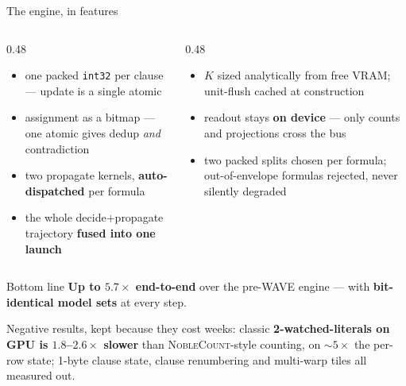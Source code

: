 \documentclass[aspectratio=169,11pt]{beamer}
\newcommand{\good}[1]{\textcolor{gpapgreen}{#1}}
\newcommand{\rem}[1]{{\footnotesize\textcolor{gpapgray}{#1}}}
\newcommand{\NC}{\textsc{NobleCount}}
\newcommand{\keyw}[1]{\textcolor{gpapblue}{\textbf{#1}}}
\begin{document}
\begin{frame}{The engine, in features}
  \begin{columns}[T]
    \begin{column}{0.48\textwidth}
      \begin{itemize}\small
        \item one packed \texttt{int32} per clause --- update is a single atomic
        \item assignment as a bitmap --- one atomic gives dedup \emph{and} contradiction
        \item two propagate kernels, \keyw{auto-dispatched} per formula
        \item the whole decide$+$propagate trajectory \keyw{fused into one launch}
      \end{itemize}
    \end{column}
    \begin{column}{0.48\textwidth}
      \begin{itemize}\small
        \item $K$ sized analytically from free VRAM; unit-flush cached at construction
        \item readout stays \keyw{on device} --- only counts and projections cross the bus
        \item two packed splits chosen per formula; out-of-envelope formulas rejected, never
          silently degraded
      \end{itemize}
    \end{column}
  \end{columns}
  \vspace{0.6em}
  \begin{block}{Bottom line}
    \centering
    \good{\textbf{Up to $5.7\times$ end-to-end}} over the pre-WAVE engine --- with
    \keyw{bit-identical model sets} at every step.
  \end{block}
  \rem{Negative results, kept because they cost weeks: classic \textbf{2-watched-literals on GPU
  is $1.8$--$2.6\times$ slower} than \NC-style counting, on ${\sim}5\times$ the per-row state;
  1-byte clause state, clause renumbering and multi-warp tiles all measured out.}
\end{frame}
\end{document}

